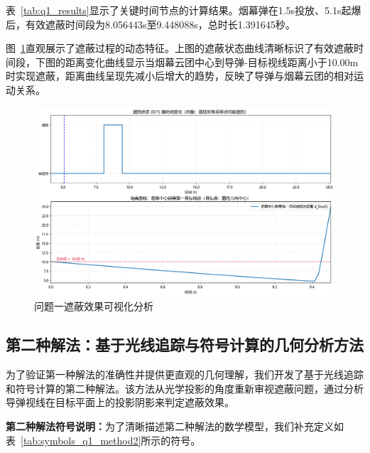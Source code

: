 表~\ref{tab:q1_results}显示了关键时间节点的计算结果。烟幕弹在1.5s投放、5.1s起爆后，有效遮蔽时间段为8.056443s至9.448088s，总时长1.391645秒。

图~\ref{fig:q1_visualization}直观展示了遮蔽过程的动态特征。上图的遮蔽状态曲线清晰标识了有效遮蔽时间段，下图的距离变化曲线显示当烟幕云团中心到导弹-目标视线距离小于10.00m时实现遮蔽，距离曲线呈现先减小后增大的趋势，反映了导弹与烟幕云团的相对运动关系。

\begin{figure}[htbp]
\centering
\includegraphics[width=\textwidth]{figures/A_1_1.png}
\caption{问题一遮蔽效果可视化分析}
\label{fig:q1_visualization}
\end{figure}

\subsection{第二种解法：基于光线追踪与符号计算的几何分析方法}

为了验证第一种解法的准确性并提供更直观的几何理解，我们开发了基于光线追踪和符号计算的第二种解法。该方法从光学投影的角度重新审视遮蔽问题，通过分析导弹视线在目标平面上的投影阴影来判定遮蔽效果。

\textbf{第二种解法符号说明：}为了清晰描述第二种解法的数学模型，我们补充定义如表~\ref{tab:symbols_q1_method2}所示的符号。

